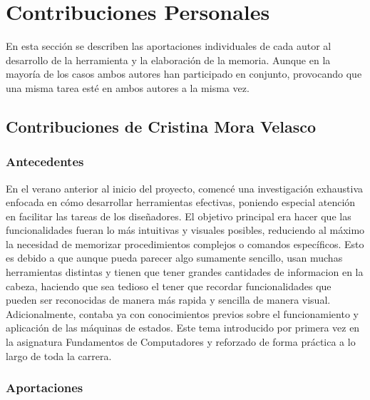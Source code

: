 \chapter*{Contribuciones Personales}
\label{cap:contribucionesPersonales}
En esta sección se describen las aportaciones individuales de cada autor al desarrollo de la herramienta y la elaboración de la memoria. Aunque en la mayoría de los casos ambos autores han participado en conjunto, provocando que una misma tarea esté en ambos autores a la misma vez.

\section*{Contribuciones de Cristina Mora Velasco}
\subsection*{Antecedentes}
En el verano anterior al inicio del proyecto, comencé una investigación exhaustiva enfocada en cómo desarrollar herramientas efectivas, poniendo especial atención en facilitar las tareas de los diseñadores. El objetivo principal era hacer que las funcionalidades fueran lo más intuitivas y visuales posibles, reduciendo al máximo la necesidad de memorizar procedimientos complejos o comandos específicos. Esto es debido a que aunque pueda parecer algo sumamente sencillo, usan muchas herramientas distintas y tienen que tener grandes cantidades de informacion en la cabeza, haciendo que sea tedioso el tener que recordar funcionalidades que pueden ser reconocidas de manera más rapida y sencilla de manera visual. 
Adicionalmente, contaba ya con conocimientos previos sobre el funcionamiento y aplicación de las máquinas de estados. Este tema introducido por primera vez en la asignatura Fundamentos de Computadores y reforzado de forma práctica a lo largo de toda la carrera. 
\subsection*{Aportaciones}
